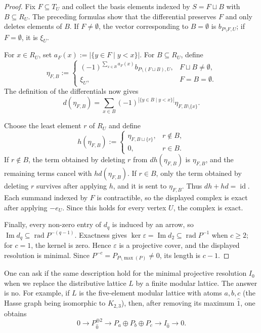 \documentclass[a4paper,leqno]{amsart}
\begin{document}
\begin{proof}
Fix $F\subseteq T_U$ and collect the basis elements indexed by $S=F\sqcup B$ with $B\subseteq R_U$.  The preceding formulas show that the differential preserves $F$ and only deletes elements of $B$.  If $F\neq\emptyset$, the vector corresponding to $B=\emptyset$ is $b_{P\setminus F,U}$; if $F=\emptyset$, it is $\xi_U$.

For $x\in R_U$, set $a_F(x):=|\{y\in F\mid y<x\}|$.  For $B\subseteq R_U$, define
\[
\eta_{F,B}:=
\begin{cases}
(-1)^{\sum_{x\in B}a_F(x)}
b_{P\setminus(F\sqcup B),U},&F\sqcup B\neq\emptyset,\\
\xi_U,&F=B=\emptyset.
\end{cases}
\]
The definition of the differentials now gives
\[
d(\eta_{F,B})
=\sum_{x\in B}
(-1)^{|\{y\in B\mid y<x\}|}
\eta_{F,B\setminus\{x\}}.
\]

Choose the least element $r$ of $R_U$ and define
\[
h(\eta_{F,B})
:=
\begin{cases}
\eta_{F,B\sqcup\{r\}},&r\notin B,\\
0,&r\in B.
\end{cases}
\]
If $r\notin B$, the term obtained by deleting $r$ from $dh(\eta_{F,B})$ is $\eta_{F,B}$, and the remaining terms cancel with $hd(\eta_{F,B})$.  If $r\in B$, only the term obtained by deleting $r$ survives after applying $h$, and it is sent to $\eta_{F,B}$.  Thus $dh+hd=\operatorname{id}$.  Each summand indexed by $F$ is contractible, so the displayed complex is exact after
applying $-e_U$.  Since this holds for every vertex $U$, the complex
is exact.

Finally, every non-zero entry of $d_q$ is induced by an arrow, so $\operatorname{Im}d_q\subseteq\operatorname{rad}P^{-(q-1)}$.  Exactness gives $\ker\varepsilon=\operatorname{Im}d_2\subseteq\operatorname{rad}P^{-1}$ when $c\geq2$; for $c=1$, the kernel is zero.  Hence $\varepsilon$ is a projective cover, and the displayed resolution is minimal.  Since $P^{-c}=P_{P\setminus\max(P)}\neq0$, its length is $c-1$.
\end{proof}

\begin{rmk}
One can ask if the same description hold for the minimal projective resolution $I_{0}$ when we replace the distributive lattice $L$ by a finite modular lattice.  The answer is no.
For example, if $L$ is the five-element modular lattice with atoms $a,b,c$ (the Hasse graph being isomorphic to $K_{2,3}$), then, after removing its maximum $\hat 1$, one obtains
$$0\longrightarrow P_{\hat 0}^{\oplus 2}
\longrightarrow P_a\oplus P_b\oplus P_c
\longrightarrow I_{\hat 0}
\longrightarrow 0.$$
\end{rmk}
\end{document}
